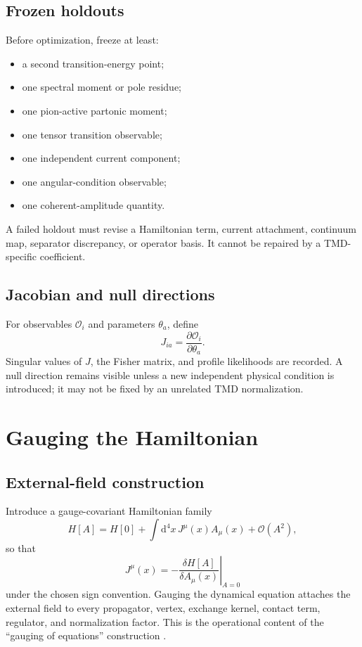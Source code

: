 \documentclass[11pt]{article}
\newcommand{\dd}{\mathrm{d}}
\newcommand{\cO}{\mathcal O}
\begin{document}
\subsection{Frozen holdouts}

Before optimization, freeze at least:
\begin{itemize}
\item a second transition-energy point;
\item one spectral moment or pole residue;
\item one pion-active partonic moment;
\item one tensor transition observable;
\item one independent current component;
\item one angular-condition observable;
\item one coherent-amplitude quantity.
\end{itemize}
A failed holdout must revise a Hamiltonian term, current attachment, continuum
map, separator discrepancy, or operator basis.  It cannot be repaired by a
TMD-specific coefficient.

\subsection{Jacobian and null directions}

For observables \(\cO_i\) and parameters \(\theta_a\), define
\begin{equation}
 J_{ia}=\frac{\partial\cO_i}{\partial\theta_a}.
 \label{eq:calibration-jacobian}
\end{equation}
Singular values of \(J\), the Fisher matrix, and profile likelihoods are
recorded.  A null direction remains visible unless a new independent physical
condition is introduced; it may not be fixed by an unrelated TMD
normalization.

\section{Gauging the Hamiltonian}
\label{sec:gauging}

\subsection{External-field construction}

Introduce a gauge-covariant Hamiltonian family
\begin{equation}
 H[A]=H[0]+\int\dd^4x\,J^\mu(x)A_\mu(x)+\cO(A^2),
 \label{eq:gauged-hamiltonian}
\end{equation}
so that
\begin{equation}
 J^\mu(x)
 =
 -\left.\frac{\delta H[A]}{\delta A_\mu(x)}\right|_{A=0}
 \label{eq:current-functional}
\end{equation}
under the chosen sign convention.  Gauging the dynamical equation attaches the
external field to every propagator, vertex, exchange kernel, contact term,
regulator, and normalization factor.  This is the operational content of the
``gauging of equations'' construction \cite{KvinikhidzeBlankleider1999I,KvinikhidzeBlankleider1999II}.
\end{document}
